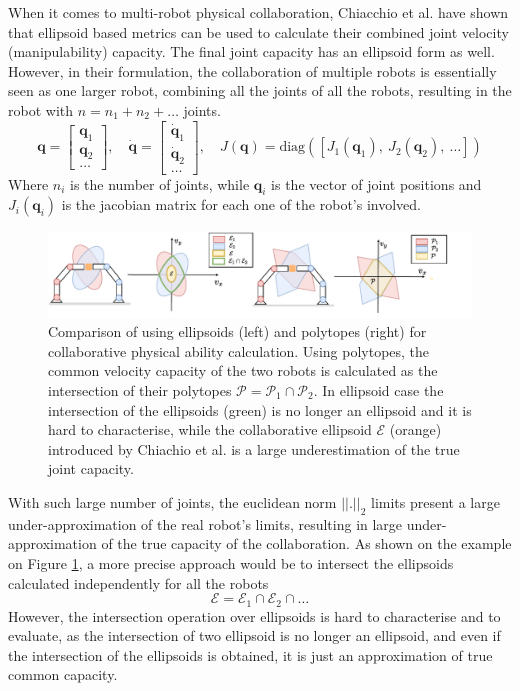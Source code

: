 When it comes to multi-robot physical collaboration, Chiacchio et al. \cite{chiacchio_global_1991} have shown that ellipsoid based metrics can be used to calculate their combined joint velocity (manipulability) capacity. The final joint capacity has an ellipsoid form as well.  However, in their formulation, the collaboration of multiple robots is essentially seen as one larger robot, combining all the joints of all the robots, resulting in the robot with $n=n_1 + n_2 + \ldots$ joints.
\begin{equation}
    \bm{q} = \begin{bmatrix}
        \bm{q}_1\\ \bm{q}_2 \\ \ldots
    \end{bmatrix}, \quad
    \dot{\bm{q}} = \begin{bmatrix}
        \dot{\bm{q}}_1\\\dot{\bm{q}}_2 \\ \ldots
    \end{bmatrix}, \quad
    J(\bm{q}) = \text{diag}([J_1(\bm{q}_1),~ J_2(\bm{q}_2),~\ldots])
\end{equation} 
Where $n_i$ is the number of joints, while $\bm{q}_i$ is the vector of joint positions and $J_i(\bm{q}_i)$ is the jacobian matrix for each one of the robot's involved.

\begin{figure}[!h]
    \centering
    \includegraphics[width=1.05\linewidth]{Chapters/imgs/collab_manip_poly.pdf}
    \caption{Comparison of using ellipsoids (left) and polytopes (right) for collaborative physical ability calculation. Using polytopes, the common velocity capacity of the two robots is calculated as the intersection of their polytopes $\mathcal{P}=\mathcal{P}_1 \cap \mathcal{P}_2$. In ellipsoid case the intersection of the ellipsoids (green) is no longer an ellipsoid and it is hard to characterise, while the collaborative ellipsoid $\mathcal{E}$ (orange) introduced by Chiachio et al. \cite{chiacchio_global_1991} is a large underestimation of the true joint capacity.}
    \label{fig:collab_mani_poly}
\end{figure}
With such large number of joints, the euclidean norm $||.||_2$ limits present a large under-approximation of the real robot's limits, resulting in large under-approximation of the true capacity of the collaboration. As shown on the example on Figure \ref{fig:collab_mani_poly}, a more precise approach would be to intersect the ellipsoids calculated independently for all the robots $$\mathcal{E}=\mathcal{E}_1 \cap \mathcal{E}_2  \cap \ldots$$ However, the intersection operation over ellipsoids is hard to characterise and to evaluate, as the intersection of two ellipsoid is no longer an ellipsoid, and even if the intersection of the ellipsoids is obtained, it is just an approximation of true common capacity. 

